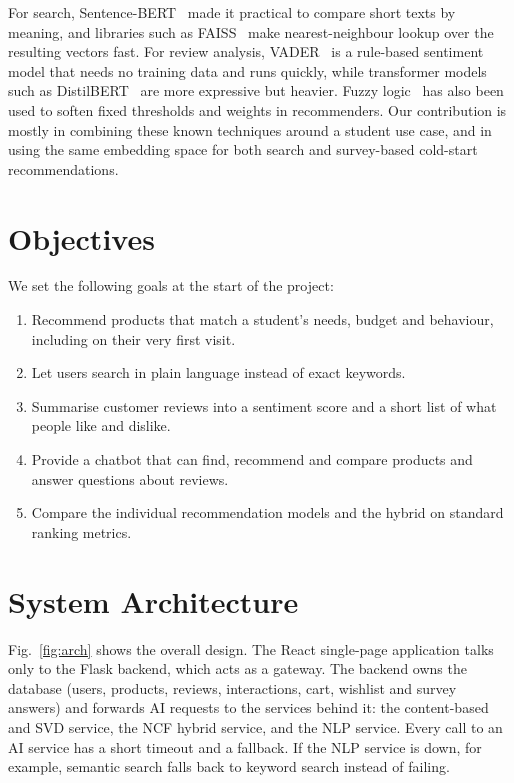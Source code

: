 \documentclass[conference]{IEEEtran}
\begin{document}
For search, Sentence-BERT~\cite{reimers2019} made it practical to compare short texts by meaning, and libraries such as FAISS~\cite{johnson2019} make nearest-neighbour lookup over the resulting vectors fast. For review analysis, VADER~\cite{hutto2014} is a rule-based sentiment model that needs no training data and runs quickly, while transformer models such as DistilBERT~\cite{sanh2019} are more expressive but heavier. Fuzzy logic~\cite{zadeh1965} has also been used to soften fixed thresholds and weights in recommenders. Our contribution is mostly in combining these known techniques around a student use case, and in using the same embedding space for both search and survey-based cold-start recommendations.

\section{Objectives}
We set the following goals at the start of the project:
\begin{enumerate}
\item Recommend products that match a student's needs, budget and behaviour, including on their very first visit.
\item Let users search in plain language instead of exact keywords.
\item Summarise customer reviews into a sentiment score and a short list of what people like and dislike.
\item Provide a chatbot that can find, recommend and compare products and answer questions about reviews.
\item Compare the individual recommendation models and the hybrid on standard ranking metrics.
\end{enumerate}

\section{System Architecture}
Fig.~\ref{fig:arch} shows the overall design. The React single-page application talks only to the Flask backend, which acts as a gateway. The backend owns the database (users, products, reviews, interactions, cart, wishlist and survey answers) and forwards AI requests to the services behind it: the content-based and SVD service, the NCF hybrid service, and the NLP service. Every call to an AI service has a short timeout and a fallback. If the NLP service is down, for example, semantic search falls back to keyword search instead of failing.
\end{document}
